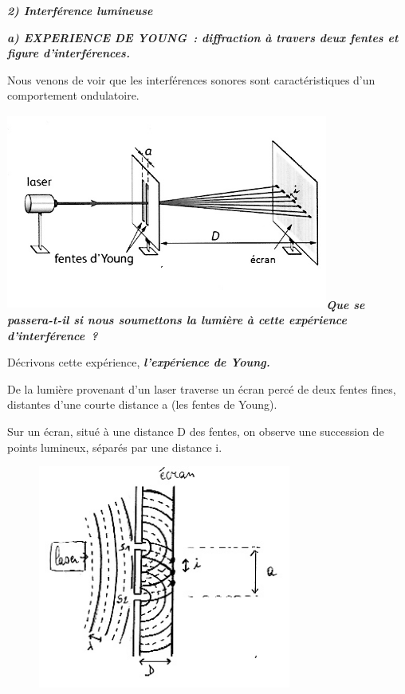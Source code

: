 \emph{\textbf{2) Interférence lumineuse }}

\emph{\textbf{a) EXPERIENCE DE YOUNG~: diffraction à travers deux fentes
et figure d'interférences. }}

Nous venons de voir que les interférences sonores sont caractéristiques
d'un comportement ondulatoire.

\includegraphics[width=10.592cm,height=6.443cm]{Pictures/100000010000025A000001696E99605075C8F3D0.png}\emph{\textbf{Que
se passera-t-il si nous soumettons la lumière à cette expérience
d'interférence~? }}

Décrivons cette expérience, \emph{\textbf{l'expérience de Young.}}

De la lumière provenant d'un laser traverse un écran percé de deux
fentes fines, distantes d'une courte distance a (les fentes de Young).

Sur un écran, situé à une distance D des fentes, on observe une
succession de points lumineux, séparés par une distance i.

\begin{figure}
\centering
\includegraphics[width=8.299cm,height=7.35cm]{Pictures/10000001000001410000011C9E9E805F9A9605B7.png}
\caption{}
\end{figure}

